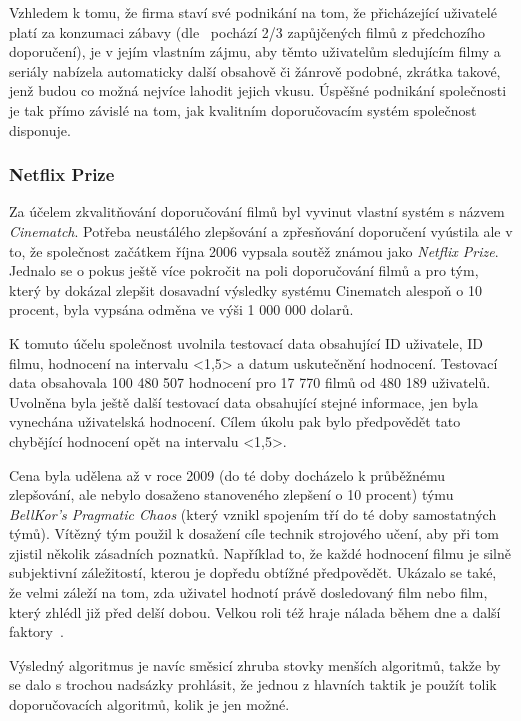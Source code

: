\documentclass[thesis=M,czech]{FITthesis}[2014/05/07]
\begin{document}
Vzhledem k tomu, že firma staví své podnikání na tom, že přicházející uživatelé platí za konzumaci zábavy (dle~\cite{netflixrec} pochází 2/3 zapůjčených filmů z předchozího doporučení), je v jejím vlastním zájmu, aby těmto uživatelům sledujícím filmy a seriály nabízela automaticky další obsahově či žánrově podobné, zkrátka takové, jenž budou co možná nejvíce lahodit jejich vkusu. Úspěšné podnikání společnosti je tak přímo závislé na tom, jak kvalitním doporučovacím systém společnost disponuje. 

\subsubsection{Netflix Prize}

Za účelem zkvalitňování doporučování filmů byl vyvinut vlastní systém s názvem \emph{Cinematch}. Potřeba neustálého zlepšování a zpřesňování doporučení vyústila ale v to, že společnost začátkem října 2006 vypsala soutěž známou jako \emph{Netflix Prize}. Jednalo se o pokus ještě více pokročit na poli doporučování filmů a pro tým, který by dokázal zlepšit dosavadní výsledky systému Cinematch alespoň o 10 procent, byla vypsána odměna ve výši 1 000 000 dolarů.

K tomuto účelu společnost uvolnila testovací data obsahující ID uživatele, ID filmu, hodnocení na intervalu <1,5> a datum uskutečnění hodnocení. Testovací data obsahovala 100 480 507 hodnocení pro 17 770 filmů od 480 189 uživatelů. Uvolněna byla ještě další testovací data obsahující stejné informace, jen byla vynechána uživatelská hodnocení. Cílem úkolu pak bylo předpovědět tato chybějící hodnocení opět na intervalu <1,5>.

Cena byla udělena až v roce 2009 (do té doby docházelo k průběžnému zlepšování, ale nebylo dosaženo stanoveného zlepšení o 10 procent) týmu \emph{BellKor's Pragmatic Chaos} (který vznikl spojením tří do té doby samostatných týmů). Vítězný tým použil k dosažení cíle technik strojového učení, aby při tom zjistil několik zásadních poznatků. Například to, že každé hodnocení filmu je silně subjektivní záležitostí, kterou je dopředu obtížné předpovědět. Ukázalo se také, že velmi záleží na tom, zda uživatel hodnotí právě dosledovaný film nebo film, který zhlédl již před delší dobou. Velkou roli též hraje nálada během dne a další faktory~\cite{bellkor}.

Výsledný algoritmus je navíc směsicí zhruba stovky menších algoritmů, takže by se dalo s trochou nadsázky prohlásit, že jednou z hlavních taktik je použít tolik doporučovacích algoritmů, kolik je jen možné. 
\end{document}
